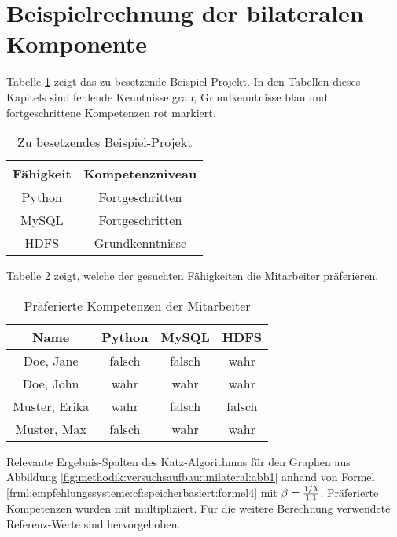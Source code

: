 \section{Beispielrechnung der bilateralen Komponente}
\label{ch:nebenrechnungen:bilateral}
Tabelle \ref{tbl:nebenrechnungen:bilateral:tbl1} zeigt das zu besetzende Beispiel-Projekt. In den Tabellen dieses Kapitels sind fehlende Kenntnisse grau, Grundkenntnisse blau und fortgeschrittene Kompetenzen rot markiert.
\begin{table}[h]
	\centering
	\begin{tabular}{c|c}
		Fähigkeit & Kompetenzniveau \\
		\hline
		Python  & \cellcolor{usercolor}Fortgeschritten\\
		MySQL   & \cellcolor{usercolor}Fortgeschritten\\
		HDFS    & \cellcolor{itemcolor}Grundkenntnisse
	\end{tabular}
	\caption{Zu besetzendes Beispiel-Projekt}
	\label{tbl:nebenrechnungen:bilateral:tbl1}
\end{table}

Tabelle \ref{tbl:nebenrechnungen:bilateral:tbl3} zeigt, welche der gesuchten Fähigkeiten die Mitarbeiter präferieren.
\begin{table}[h]
	\centering
	\begin{tabular}{c|c|c|c}
		Name & Python & MySQL & HDFS \\
		\hline
		Doe, Jane     & \cellcolor{usercolor}falsch & \cellcolor{usercolor}falsch & \cellcolor{SeaGreen}wahr\\
		Doe, John     & \cellcolor{SeaGreen}wahr   & \cellcolor{SeaGreen}wahr   & \cellcolor{SeaGreen}wahr\\
		Muster, Erika & \cellcolor{SeaGreen}wahr   & \cellcolor{usercolor}falsch & \cellcolor{usercolor}falsch\\
		Muster, Max   & \cellcolor{usercolor}falsch & \cellcolor{SeaGreen}wahr   & \cellcolor{SeaGreen}wahr
	\end{tabular}
	\caption{Präferierte Kompetenzen der Mitarbeiter}
	\label{tbl:nebenrechnungen:bilateral:tbl3}
\end{table}

Relevante Ergebnis-Spalten des Katz-Algorithmus für den Graphen aus Abbildung \ref{fig:methodik:versuchsaufbau:unilateral:abb1} anhand von Formel \ref{frml:empfehlungssysteme:cf:speicherbasiert:formel4} mit $\beta = \frac{1/\lambda}{1.1}$. Präferierte Kompetenzen wurden mit \faktorFloat multipliziert. Für die weitere Berechnung verwendete Referenz-Werte sind hervorgehoben.

